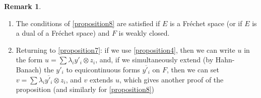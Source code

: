 \documentclass{article}
\theoremstyle{plain}
\theoremstyle{definition}
\newtheorem*{remark}{Remark}
\newcommand{\oldpage}[1]{\marginpar{\footnotesize$\Big\vert$ \textit{p.~#1}}}
\begin{document}
\begin{remark}
  \begin{enumerate}
    \item The conditions of \cref{proposition8} are satisfied if $E$ is a Fr\'{e}chet space (or if $E$ is a dual of a Fr\'{e}chet space) and $F$ is weakly
\oldpage{7}
      closed.
    \item Returning to \cref{proposition7}: if we use \cref{proposition4}, then we can write $u$ in the form $u=\sum\lambda_i y'_i\otimes z_i$, and, if we simultaneously extend (by Hahn-Banach) the $y'_i$ to equicontinuous forms $\overline{y'_i}$ on $F$, then we can set $v=\sum\lambda_i\overline{y'_i}\otimes z_i$, and $v$ extends $u$, which gives another proof of the proposition (and similarly for \cref{proposition8})
  \end{enumerate}
\end{remark}
\end{document}
